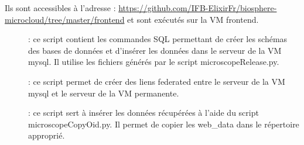Ils sont accessibles à l'adresse : \url{https://github.com/IFB-ElixirFr/biosphere-microcloud/tree/master/frontend} et sont exécutés sur la VM frontend.
\begin{description}
	\item[] :  ce script contient les commandes SQL permettant de créer les schémas des bases de données et d'insérer les données dans le serveur de la VM mysql. Il utilise les fichiers générés par le script microscopeRelease.py.
	\item[] : ce script permet de créer des liens federated entre le serveur de la VM mysql et le serveur de la VM permanente.
	\item[] : ce script sert à insérer les données récupérées à l'aide du script microscopeCopyOid.py. Il permet de copier les web\_data dans le répertoire approprié.
\end{description}

